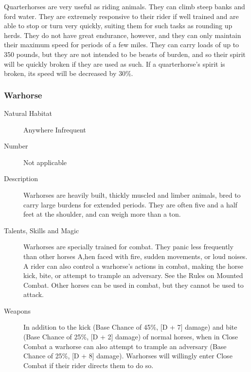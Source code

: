 \begin{multicols*}{2}
\begin{description}
\setlength\itemsep{0pt}

\item[Comments]Quarterhorses are very useful as riding animals.  They can climb steep
banks and ford water. They are extremely responsive to their rider if
well trained and are able to stop or turn very quickly, suiting them
for such tasks as rounding up herds. They do not have great endurance,
however, and they can only maintain their maximum speed for periods of
a few miles. They can carry loads of up to 350 pounds, but they are
not intended to be beasts of burden, and so their spirit will be
quickly broken if they are used as such. If a quarterhorse's spirit is
broken, its speed will be decreased by 30\%.

\end{description}

\subsubsection{Warhorse}

\begin{description}
\item[Natural Habitat] Anywhere Infrequent

\item[Number] Not applicable

\item[Description] Warhorses are heavily built, thickly muscled and limber
animals, bred to carry large burdens for extended periods. They are
often five and a half feet at the shoulder, and can weigh more than a
ton.

\item[Talents, Skills and Magic] Warhorses are specially trained for combat. They panic less
frequently than other horses A,hen faced with fire, sudden movements,
or loud noises. A rider can also control a warhorse's actions in
combat, making the horse kick, bite, or attempt to trample an
adversary.  See the Rules on Mounted Combat. Other horses can be used
in combat, but they cannot be used to attack.

\item[Weapons] In addition to the kick (Base Chance of 45\%, [D + 7]
damage) and bite (Base Chance of 25\%, [D + 2] damage) of normal
horses, when in Close Combat a warhorse can also attempt to trample an
adversary (Base Chance of 25\%, [D + 8] damage).  Warhorses will
willingly enter Close Combat if their rider directs them to do so.


\end{description}
\end{multicols*}
